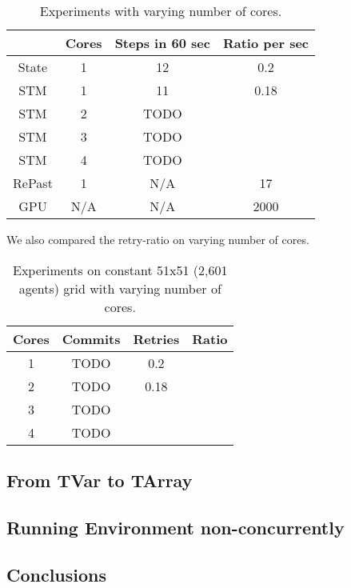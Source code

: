\begin{table}
	\centering
  	\begin{tabular}{ c || c | c | c }
               & Cores & Steps in 60 sec & Ratio per sec \\ \hline \hline 
    	State  & 1     & 12              & 0.2   \\ \hline \hline
   		STM    & 1     & 11              & 0.18  \\ \hline
   		STM    & 2     & TODO            &       \\ \hline
   		STM    & 3     & TODO            &       \\ \hline
   		STM    & 4     & TODO            &       \\ \hline \hline
   		RePast & 1     & N/A             & 17    \\ \hline \hline
   		GPU    & N/A   & N/A             & 2000  \\ \hline \hline
   	\end{tabular}
  	
  	\caption{Experiments with varying number of cores.}
	\label{tab:naive_stm_results}
\end{table}

We also compared the retry-ratio on varying number of cores.

\begin{table}
	\centering
  	\begin{tabular}{ c || c | c | c }
        Cores & Commits & Retries & Ratio \\ \hline \hline 
    	1     & TODO              & 0.2   \\ \hline \hline
   		2     & TODO              & 0.18  \\ \hline
   		3     & TODO              &       \\ \hline
   		4     & TODO              &       \\ \hline
   	\end{tabular}
  	
  	\caption{Experiments on constant 51x51 (2,601 agents) grid with varying number of cores.}
	\label{tab:constgrid_varyingcores}
\end{table}

\subsection{From TVar to TArray}

\subsection{Running Environment non-concurrently}

\subsection{Conclusions}